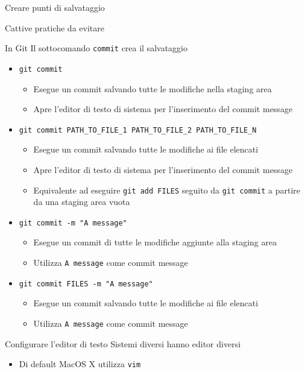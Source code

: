 \documentclass[presentation]{beamer}
\begin{document}
\begin{frame}{Creare punti di salvataggio}
\begin{block}{Cattive pratiche da evitare}
\begin{itemize}
		\end{itemize}
	\end{block}
	\begin{block}{In Git}
		Il sottocomando \texttt{commit} crea il salvataggio
		\begin{itemize}
			\item \texttt{git commit}
			\begin{itemize}
				\footnotesize
				\item Esegue un commit salvando tutte le modifiche nella staging area
				\item Apre l'editor di testo di sistema per l'inserimento del commit message
			\end{itemize}
			\item \texttt{git commit PATH\_TO\_FILE\_1 PATH\_TO\_FILE\_2 PATH\_TO\_FILE\_N}
			\begin{itemize}
				\footnotesize
				\item Esegue un commit salvando tutte le modifiche ai file elencati
				\item Apre l'editor di testo di sistema per l'inserimento del commit message
				\item Equivalente ad eseguire \texttt{git add FILES} seguito da \texttt{git commit} a partire da una staging area vuota
			\end{itemize}
			\item \texttt{git commit -m "A message"}
			\begin{itemize}
				\footnotesize
				\item Esegue un commit di tutte le modifiche aggiunte alla staging area
				\item Utilizza \texttt{A message} come commit message
			\end{itemize}
			\item \texttt{git commit FILES -m "A message"}
			\begin{itemize}
				\footnotesize
				\item Esegue un commit salvando tutte le modifiche ai file elencati
				\item Utilizza \texttt{A message} come commit message
			\end{itemize}
		\end{itemize}
	\end{block}
	\begin{block}{Configurare l'editor di testo}
		Sistemi diversi hanno editor diversi
		\begin{itemize}
			\item Di default MacOS X utilizza \texttt{vim}

\end{itemize}
\end{block}
\end{frame}
\end{document}
